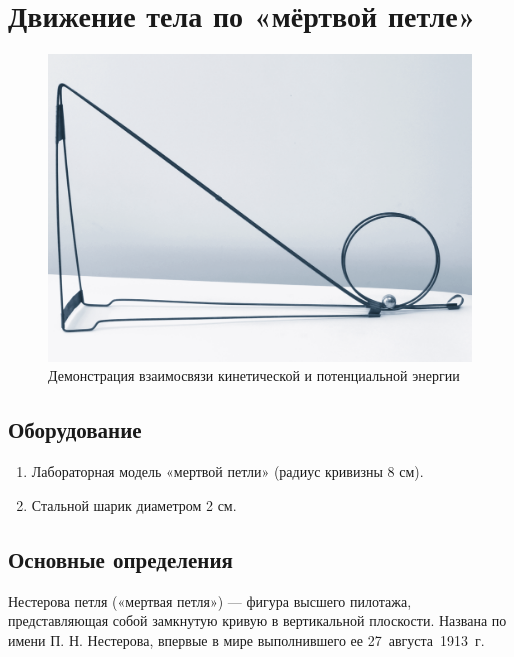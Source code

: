 \documentclass[All.tex]{subfiles}
\begin{document}


	\section{Движение тела по «мёртвой петле»}


\begin{figure}[H] 
	\centering 		
	\includegraphics[width=0.75\linewidth]{loop-1.png}
	\caption{Демонстрация взаимосвязи кинетической и потенциальной энергии}
	\label{loop-1}
\end{figure}

\subsection*{\textcolor{PineGreen}{Оборудование}}

\begin{enumerate}
	\item Лабораторная модель «мертвой петли» (радиус кривизны 8 см).
	\item Стальной шарик диаметром 2 см.
\end{enumerate}

\subsection*{\textcolor{PineGreen}{Основные определения}}

Нестерова петля («мертвая петля») — фигура высшего пилотажа, 
представляющая собой замкнутую кривую в вертикальной плоскости. 
Названа по имени П. Н. Нестерова, впервые в мире выполнившего ее 27~августа~1913~г.
\end{document}
